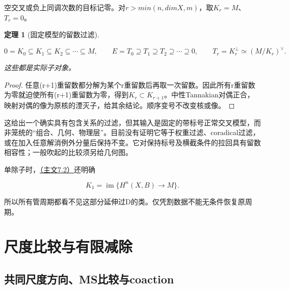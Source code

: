 \documentclass[11pt,a4paper,oneside]{ctexart}
\theoremstyle{cnplain}
\newtheorem{theorem}{定理}[section]
\theoremstyle{definition}
\theoremstyle{remark}
\numberwithin{equation}{section}
\newcommand{\otherref}[2]{\href{#1.pdf}{#2}}
\begin{document}
空交叉或负上同调次数的目标记零。对\(r>min(n,dimX,m)\)，取\(K_r=M\)、\(T_r=0\)。

\begin{theorem}[固定模型的留数过滤]

\label{thm:cut:3.1}

\begin{equation}
0=K_0\subseteq K_1\subseteq K_2\subseteq\cdots\subseteq M,
 \qquad E=T_0\supseteq T_1\supseteq T_2\supseteq\cdots\supseteq0,
 \qquad T_r=K_r^\perp\simeq(M/K_r)^\vee.              \label{eq:cut:3.4}
\end{equation}

这些都是实际子对象。

\end{theorem}

\begin{proof}

任意(r+1)重留数都分解为某个r重留数后再取一次留数。因此所有r重留数为零就迫使所有(r+1)重留数为零，得到\(K_r\subset K_{r+1}\)。中性Tannakian对偶正合，映射对偶的像为原核的湮灭子，给其余结论。顺序变号不改变核或像。

\end{proof}

这给出一个确实具有包含关系的过滤，但其输入是固定的带标号正常交叉模型，而非笼统的``组合、几何、物理层''。目前没有证明它等于权重过滤、coradical过滤，或在加入任意解消例外分量后保持不变。它对保持标号及横截条件的拉回具有留数相容性；一般吹起的比较须另给几何图。

单除子时，\otherref{feynman_periods_long_paper}{（主文7.2）}还明确

\begin{equation}
K_1=\operatorname{im}\{H^n(X,B)\to M\}.              \label{eq:cut:3.5}
\end{equation}

所以所有管周期都看不见这部分延伸过D的类。仅凭割数据不能无条件恢复原周期。


\endgroup

\section{尺度比较与有限减除}\label{supp:primitive}

\begingroup

\subsection{共同尺度方向、MS比较与coaction}\label{sec:primitive:8}
\end{document}
